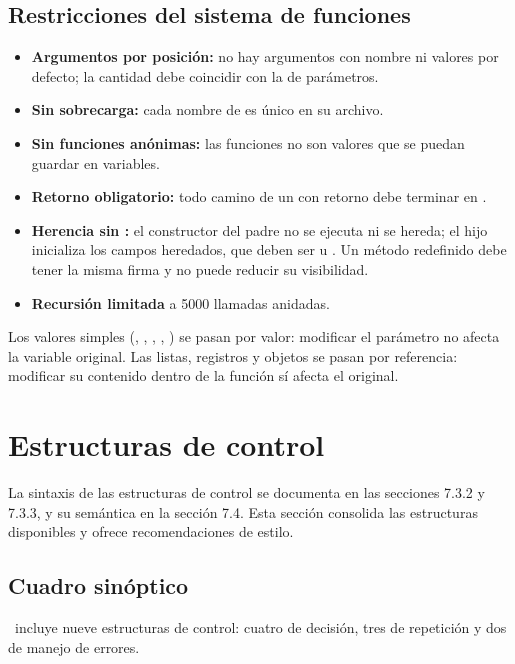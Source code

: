 \subsection{Restricciones del sistema de funciones}

\begin{itemize}
  \item \textbf{Argumentos por posición:} no hay argumentos con nombre ni valores por defecto; la cantidad debe coincidir con la de parámetros.
  \item \textbf{Sin sobrecarga:} cada nombre de  es único en su archivo.
  \item \textbf{Sin funciones anónimas:} las funciones no son valores que se puedan guardar en variables.
  \item \textbf{Retorno obligatorio:} todo camino de un  con retorno debe terminar en .
  \item \textbf{Herencia sin :} el constructor del padre no se ejecuta ni se hereda; el hijo inicializa los campos heredados, que deben ser  u . Un método redefinido debe tener la misma firma y no puede reducir su visibilidad.
  \item \textbf{Recursión limitada} a 5000 llamadas anidadas.
\end{itemize}

Los valores simples (, , , , ) se pasan por valor: modificar el parámetro no afecta la variable original. Las listas, registros y objetos se pasan por referencia: modificar su contenido dentro de la función sí afecta el original.

\newpage
\section{Estructuras de control}

La sintaxis de las estructuras de control se documenta en las secciones 7.3.2 y 7.3.3, y su semántica en la sección 7.4. Esta sección consolida las estructuras disponibles y ofrece recomendaciones de estilo.

\subsection{Cuadro sinóptico}

\ggez\ incluye nueve estructuras de control: cuatro de decisión, tres de repetición y dos de manejo de errores.


